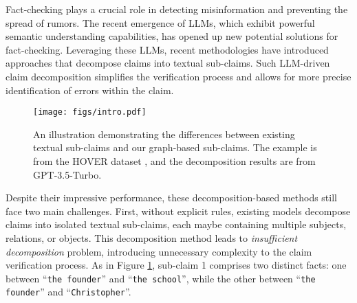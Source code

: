 Fact-checking plays a crucial role in detecting misinformation and preventing the spread of rumors. 
The recent emergence of LLMs, which exhibit powerful semantic understanding capabilities, has opened up new potential solutions for fact-checking. Leveraging these LLMs, recent methodologies \cite{pan2023fact, wang2023explainable, zhao2024pacar} have introduced approaches that decompose claims into textual sub-claims. Such LLM-driven claim decomposition simplifies the verification process and allows for more precise identification of errors within the claim.


\begin{figure}
    \centering
    \texttt{[image: figs/intro.pdf]}
    \caption{An illustration demonstrating the differences between existing textual sub-claims and our graph-based sub-claims. The example is from the HOVER dataset \cite{jiang2020hover}, and the decomposition results are from GPT-3.5-Turbo.}
    \label{fig:intro}
\end{figure}

Despite their impressive performance, these decomposition-based methods still face two main challenges. First, without explicit rules, existing models decompose claims into isolated textual sub-claims, each maybe containing multiple subjects, relations, or objects. This decomposition method leads to {\it insufficient decomposition} problem, introducing unnecessary complexity to the claim verification process. As in Figure \ref{fig:intro}, sub-claim 1 comprises two distinct facts: one between ``{\tt the founder}'' and ``{\tt the school}'', while the other between ``{\tt the founder}'' and ``{\tt Christopher}''.


